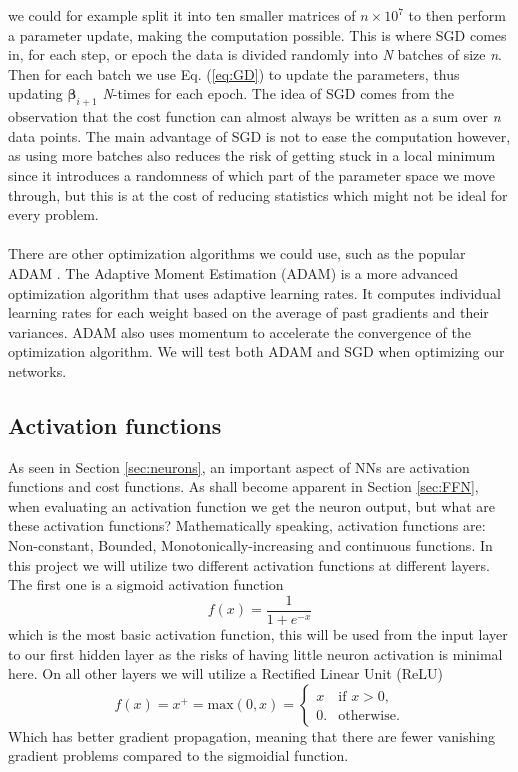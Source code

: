 \documentclass[12pt, a4paper]{book}
\begin{document}
we could for example split it into ten smaller matrices of $n\times10^7$ to then perform a parameter update, making the computation possible. This is where SGD comes in, for each step, or epoch the data is divided randomly into 
\textit{N} batches of size \textit{n}. Then for each batch we use Eq. (\ref{eq:GD}) to update the parameters, thus updating $\bm{\beta}_{i+1}$ \textit{N}-times for each epoch. The idea of SGD comes from the observation that the 
cost function can almost always be written as a sum over \textit{n} data points. The main advantage of SGD is not to ease the computation however, as using more batches also reduces the risk of getting stuck in a local minimum since it introduces a randomness of which part of the parameter space we move through, 
but this is at the cost of reducing statistics which might not be ideal for every problem.\\
\\There are other optimization algorithms we could use, such as the popular ADAM \cite{kingma2017adam}. The Adaptive Moment Estimation (ADAM) is a more advanced optimization algorithm that uses adaptive learning rates. It computes individual learning rates for each weight based on the average of past gradients 
and their variances. ADAM also uses momentum to accelerate the convergence of the optimization algorithm. We will test both ADAM and SGD when optimizing our networks.

\subsection{Activation functions}\label{sec:act}
As seen in Section \ref{sec:neurons}, an important aspect of NNs are activation functions and cost functions. As shall become apparent in Section \ref{sec:FFN}, when evaluating an activation function we get the neuron output, but what are these activation functions? 
Mathematically speaking, activation functions are: Non-constant, Bounded, Monotonically-increasing and continuous functions. In this project we will utilize two different activation functions at different layers. 
The first one is a sigmoid activation function
\begin{equation}\label{eq:sig}
    f(x) = \frac{1}{1+e^{-x}}
\end{equation}
which is the most basic activation function, this will be used from the input layer to our first hidden layer as the risks of having little neuron activation is minimal here. On all other layers we will utilize a Rectified Linear Unit (ReLU)
\begin{equation}\label{eq:ReLU}
    f(x) = x^+ = \text{max}(0,x) = \begin{cases}x&{\text{if }}x>0,\\0.&{\text{otherwise}}.\end{cases}
\end{equation}
Which has better gradient propagation, meaning that there are fewer vanishing gradient problems compared to the sigmoidial function.
\end{document}
